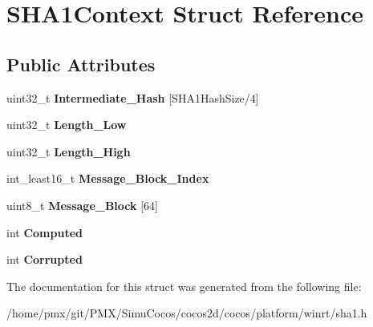 \hypertarget{structSHA1Context}{}\section{S\+H\+A1\+Context Struct Reference}
\label{structSHA1Context}
\subsection*{Public Attributes}
\begin{DoxyCompactItemize}
\item 
\mbox{\label{structSHA1Context_a6d4330353a57a47afd49c4f1b9d6cb92}} 
uint32\+\_\+t {\bfseries Intermediate\+\_\+\+Hash} \mbox{[}S\+H\+A1\+Hash\+Size/4\mbox{]}
\item 
\mbox{\label{structSHA1Context_ac352e4c9ff22eef52af0d76b52765426}} 
uint32\+\_\+t {\bfseries Length\+\_\+\+Low}
\item 
\mbox{\label{structSHA1Context_a01654134ccdc020bb9a855b4d5198116}} 
uint32\+\_\+t {\bfseries Length\+\_\+\+High}
\item 
\mbox{\label{structSHA1Context_af59a4b732989a1b7c11c03a177a810ba}} 
int\+\_\+least16\+\_\+t {\bfseries Message\+\_\+\+Block\+\_\+\+Index}
\item 
\mbox{\label{structSHA1Context_ab9a620b6c84fc2baad67f285a8931623}} 
uint8\+\_\+t {\bfseries Message\+\_\+\+Block} \mbox{[}64\mbox{]}
\item 
\mbox{\label{structSHA1Context_a3722d8be51c7a1a4e8083c3f1a5adfa1}} 
int {\bfseries Computed}
\item 
\mbox{\label{structSHA1Context_af549987a735051dc4b3b50b106fde5bb}} 
int {\bfseries Corrupted}
\end{DoxyCompactItemize}


The documentation for this struct was generated from the following file\+:\begin{DoxyCompactItemize}
\item 
/home/pmx/git/\+P\+M\+X/\+Simu\+Cocos/cocos2d/cocos/platform/winrt/sha1.\+h\end{DoxyCompactItemize}
